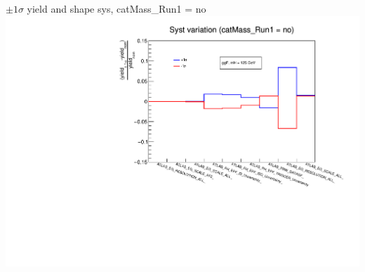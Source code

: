 \documentclass[10pt,UKenglish, leqno, xcolor = dvipsnames]{beamer}
\begin{document}
				
		\begin{frame}{$\pm1\sigma$ yield and shape sys, catMass\_Run1 = no}
			\vfill
			\centering
			\includegraphics[width=.9\textwidth]{../images/week_13/Syst/var_cat_no.pdf}
			\vfill
		\end{frame}
		
\end{document}
